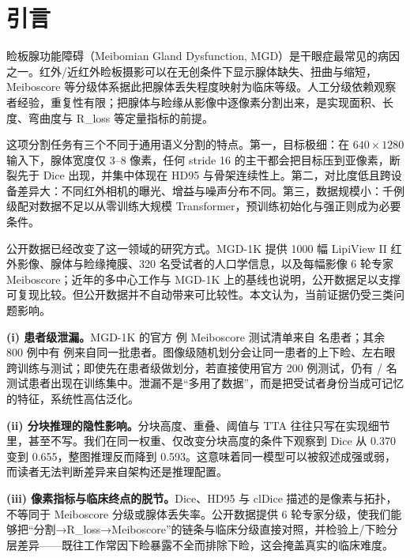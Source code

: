 \section{引言}\label{sec:intro}

睑板腺功能障碍（Meibomian Gland Dysfunction, MGD）是干眼症最常见的病因之一\cite{foulks2003,villani2020latest}。红外/近红外睑板摄影可以在无创条件下显示腺体缺失、扭曲与缩短，Meiboscore 等分级体系据此把腺体丢失程度映射为临床等级\cite{wise2012meibography,ngo2014repeat}。人工分级依赖观察者经验，重复性有限；把腺体与睑缘从影像中逐像素分割出来，是实现面积、长度、弯曲度与 R\_loss 等定量指标的前提。

这项分割任务有三个不同于通用语义分割的特点。第一，目标极细：在 $640\times1280$ 输入下，腺体宽度仅 3--8 像素，任何 stride 16 的主干都会把目标压到亚像素，断裂先于 Dice 出现，并集中体现在 HD95 与骨架连续性上。第二，对比度低且跨设备差异大：不同红外相机的曝光、增益与噪声分布不同。第三，数据规模小：千例级配对数据不足以从零训练大规模 Transformer，预训练初始化与强正则成为必要条件\cite{saha2022automated,setu2021deep}。

公开数据已经改变了这一领域的研究方式。MGD-1K 提供 1000 幅 LipiView II 红外影像、腺体与睑缘掩膜、320 名受试者的人口学信息，以及每幅影像 6 轮专家 Meiboscore\cite{saha2022automated}；近年的多中心工作与 MGD-1K 上的基线也说明，公开数据足以支撑可复现比较\cite{li2025multicenter,yu2025quantitative}。但公开数据并不自动带来可比较性。本文认为，当前证据仍受三类问题影响。

\textbf{(i) 患者级泄漏。}MGD-1K 的官方 \officialTestImages{} 例 Meiboscore 测试清单来自 \officialTestPatients{} 名患者；其余 800 例中有 \officialLeakImages{} 例来自同一批患者。图像级随机划分会让同一患者的上下睑、左右眼跨训练与测试；即使先在患者级做划分，若直接使用官方 200 例测试，仍有 \officialLeakPatients/\officialTestPatients{} 名测试患者出现在训练集中。泄漏不是“多用了数据”，而是把受试者身份当成可记忆的特征，系统性高估泛化。

\textbf{(ii) 分块推理的隐性影响。}分块高度、重叠、阈值与 TTA 往往只写在实现细节里，甚至不写。我们在同一权重、仅改变分块高度的条件下观察到 Dice 从 0.370 变到 0.655，整图推理反而降到 0.593。这意味着同一模型可以被叙述成强或弱，而读者无法判断差异来自架构还是推理配置。

\textbf{(iii) 像素指标与临床终点的脱节。}Dice、HD95 与 clDice 描述的是像素与拓扑，不等同于 Meiboscore 分级或腺体丢失率。公开数据提供 6 轮专家分级，使我们能够把“分割→R\_loss→Meiboscore”的链条与临床分级直接对照，并检验上/下睑分层差异——既往工作常因下睑暴露不全而排除下睑，这会掩盖真实的临床难度。

